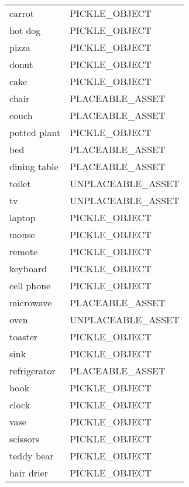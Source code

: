 \begin{supertabular}{|l|l|}
  carrot                & \tiny{PICKLE\_OBJECT    } \\
  hot dog               & \tiny{PICKLE\_OBJECT    } \\
  pizza                 & \tiny{PICKLE\_OBJECT    } \\
  donut                 & \tiny{PICKLE\_OBJECT    } \\
  cake                  & \tiny{PICKLE\_OBJECT    } \\
  chair                 & \tiny{PLACEABLE\_ASSET  } \\
  couch                 & \tiny{PLACEABLE\_ASSET  } \\
  potted plant          & \tiny{PICKLE\_OBJECT    } \\
  bed                   & \tiny{PLACEABLE\_ASSET  } \\
  dining table          & \tiny{PLACEABLE\_ASSET  } \\
  toilet                & \tiny{UNPLACEABLE\_ASSET} \\
  tv                    & \tiny{UNPLACEABLE\_ASSET} \\
  laptop                & \tiny{PICKLE\_OBJECT    } \\
  mouse                 & \tiny{PICKLE\_OBJECT    } \\
  remote                & \tiny{PICKLE\_OBJECT    } \\
  keyboard              & \tiny{PICKLE\_OBJECT    } \\
  cell phone            & \tiny{PICKLE\_OBJECT    } \\
  microwave             & \tiny{PLACEABLE\_ASSET  } \\
  oven                  & \tiny{UNPLACEABLE\_ASSET} \\
  toaster               & \tiny{PICKLE\_OBJECT    } \\
  sink                  & \tiny{PICKLE\_OBJECT    } \\
  refrigerator          & \tiny{PLACEABLE\_ASSET  } \\
  book                  & \tiny{PICKLE\_OBJECT    } \\
  clock                 & \tiny{PICKLE\_OBJECT    } \\
  vase                  & \tiny{PICKLE\_OBJECT    } \\
  scissors              & \tiny{PICKLE\_OBJECT    } \\
  teddy bear            & \tiny{PICKLE\_OBJECT    } \\
  hair drier            & \tiny{PICKLE\_OBJECT    } \\

\end{supertabular}
